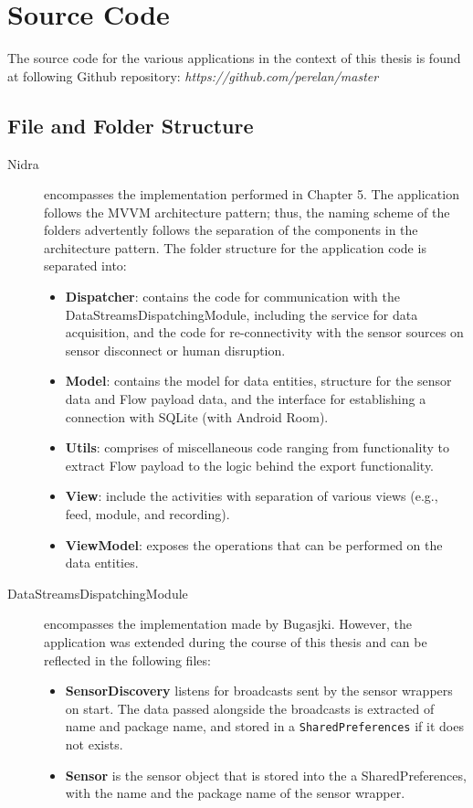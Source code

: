 \chapter{Source Code}
The source code for the various applications in the context of this thesis is found at following Github repository: \textit{https://github.com/perelan/master}

\section{File and Folder Structure}
\begin{description}
    \item[Nidra] encompasses the implementation performed in Chapter 5. The application follows the MVVM architecture pattern; thus, the naming scheme of the folders advertently follows the separation of the components in the architecture pattern. The folder structure for the application code is separated into:
    \begin{itemize}
        \item \textbf{Dispatcher}: contains the code for communication with the DataStreamsDispatchingModule, including the service for data acquisition, and the code for re-connectivity with the sensor sources on sensor disconnect or human disruption.
        \item \textbf{Model}: contains the model for data entities, structure for the sensor data and Flow payload data, and the interface for establishing a connection with SQLite (with Android Room).
        \item \textbf{Utils}: comprises of miscellaneous code ranging from functionality to extract Flow payload to the logic behind the export functionality. 
        \item \textbf{View}: include the activities with separation of various views (e.g., feed, module, and recording). 
        \item \textbf{ViewModel}: exposes the operations that can be performed on the data entities. 
    \end{itemize}

    \item[DataStreamsDispatchingModule] encompasses the implementation made by Bugasjki. However, the application was extended during the course of this thesis and can be reflected in the following files: 
    \begin{itemize}
        \item \textbf{SensorDiscovery} listens for broadcasts sent by the sensor wrappers on start. The data passed alongside the broadcasts is extracted of name and package name, and stored in a \verb|SharedPreferences| if it does not exists. 
        \item \textbf{Sensor} is the sensor object that is stored into the a SharedPreferences, with the name and the package name of the sensor wrapper. 
    \end{itemize}


\end{description}
